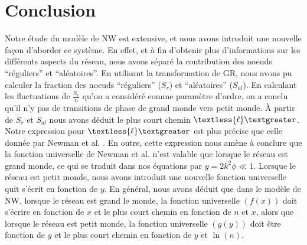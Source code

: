\section{Conclusion}
Notre étude du modèle de NW est extensive, et nous avons introduit une nouvelle façon d'aborder ce système. En effet, et à fin d'obtenir plus d'informations sur les différents aspects du réseau, nous avons séparé la contribution des noeuds ``réguliers'' et ``aléatoires''. 
En utilisant la transformation de GR, nous avons pu calculer la fraction des noeuds ``réguliers''  ($S_r$) et ``aléatoires'' ($S_{al}$). En calculant les fluctuations de $\frac {S_r}{n}$ qu'on a considéré comme paramètre d'ordre, on a conclu qu'il n'y pas de transitions de phase de grand monde vers petit monde. \`{A} partir  de $S_r$ et $S_{al}$ nous avons déduit le plus court chemin $\textless {\ell} \textgreater$. Notre expression pour $\textless {\ell} \textgreater$ est plus précise que celle donnée par Newman et al. \cite{Newman-al2000}. En outre, cette expression nous amène à conclure que la fonction universelle de Newman et al. \cite{Newman-Watts1999-2} n'est valable que lorsque le réseau est grand monde, ce qui se traduit dans nos équations par $y=2k^2\phi \ll 1$. Lorsque le réseau est petit monde, nous avons introduit une nouvelle fonction universelle quit s'écrit en fonction de $y$.  En général, nous avons déduit que dans le modèle de NW, lorsque le réseau est grand le monde, la fonction universelle $(f(x))$ doit s'écrire en fonction de $x$ et le plus court chemin en fonction de $n$ et $x$, alors que lorsque le réseau est petit monde, la fonction universelle $(g(y))$ doit être fonction de $y$ et le plus court chemin en fonction de $y$ et $\ln(n)$.

